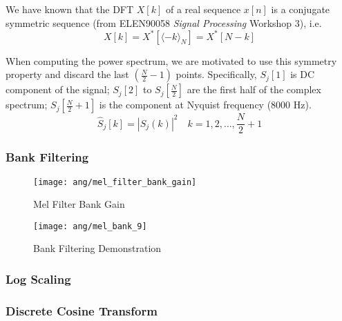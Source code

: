 We have known that the DFT $X[k]$ of a real sequence $x[n]$ is a conjugate symmetric sequence (from ELEN90058 \textit{Signal Processing} Workshop 3), i.e.
\begin{equation}
X[k] = X^*[\langle-k\rangle_{N}] = X^*[N-k]
\end{equation}

When computing the power spectrum, we are motivated to use this symmetry property and discard the last $(\frac{N}{2} - 1)$ points. Specifically, $S_j[1]$ is DC component of the signal; $S_j[2]$ to $S_j[\frac{N}{2}]$ are the first half of the complex spectrum; $S_j[\frac{N}{2} + 1]$ is the component at Nyquist frequency (8000 Hz).
\begin{equation}
\label{eq:power-spectrum}
\hat{S}_j[k] = |S_j(k)|^2 \quad k = 1, 2, \dots, \frac{N}{2} + 1
\end{equation}


\subsubsection{Bank Filtering}

\begin{figure}[H]
\centering
\texttt{[image: ang/mel\_filter\_bank\_gain]}
\caption{Mel Filter Bank Gain}
\end{figure}

\begin{figure}[H]
\centering
\texttt{[image: ang/mel\_bank\_9]}
\caption{Bank Filtering Demonstration}
\end{figure}


\subsubsection{Log Scaling}


\subsubsection{Discrete Cosine Transform}
